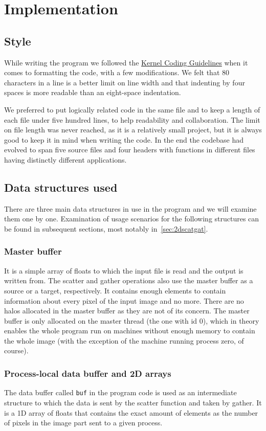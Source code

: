\documentclass[11pt,a4paper]{article}
\begin{document}
\section{Implementation}
\subsection{Style}
While writing the program we followed the \href{https://www.kernel.org/doc/Documentation/CodingStyle}{Kernel Coding Guidelines} when it comes to formatting the code, with a few modifications. 
We felt that 80 characters in a line is a better limit on line width and that indenting by four spaces is more readable than an eight-space indentation. 

We preferred to put logically related code in the same file and to keep a length of each file under five hundred lines, to help readability and collaboration. 
The limit on file length was never reached, as it is a relatively small project, but it is always good to keep it in mind when writing the code.
In the end the codebase had evolved to span five source files and four headers with functions in different files having distinctly different applications.

\subsection{Data structures used}
There are three main data structures in use in the program and we will examine them one by one.
Examination of usage scenarios for the following structures can be found in subsequent sections, most notably in~\ref{sec:2dscatgat}.

\subsubsection{Master buffer}
It is a simple array of floats to which the input file is read and the output is written from. The scatter and gather operations also use the master buffer as a source or a target, respectively. It contains enough elements to contain information about every pixel of the input image and no more. There are no halos allocated in the master buffer as they are not of its concern. The master buffer is only allocated on the master thread (the one with id 0), which in theory enables the whole program run on machines without enough memory to contain the whole image (with the exception of the machine running process zero, of course).

\subsubsection{Process-local data buffer and 2D arrays}
The data buffer called \texttt{buf} in the program code is used as an intermediate structure to which the data is sent by the scatter function and taken by gather. It is a 1D array of floats that contains the exact amount of elements as the number of pixels in the image part sent to a given process. 
\end{document}
